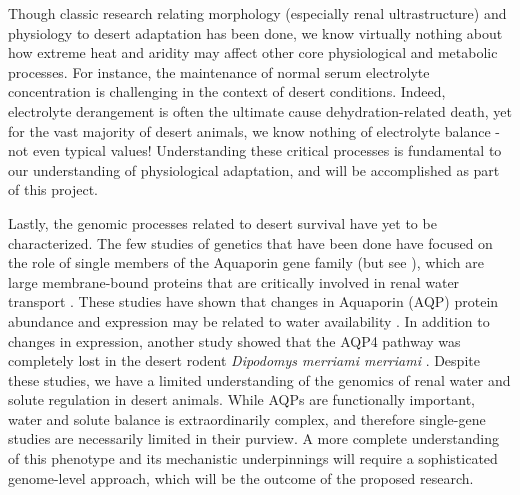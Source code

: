 \documentclass[11pt]{article}
\begin{document}
Though classic research relating morphology (especially renal ultrastructure) and physiology to desert adaptation has been done, we know virtually nothing about how extreme heat and aridity may affect other core physiological and metabolic processes. For instance, the maintenance of normal serum electrolyte concentration is challenging in the context of desert conditions. Indeed, electrolyte derangement is often the ultimate cause dehydration-related death, yet for the vast majority of desert animals, we know nothing of electrolyte balance - not even typical values! Understanding these critical processes is fundamental to our understanding of physiological adaptation, and will be accomplished as part of this project. 

Lastly, the genomic processes related to desert survival have yet to be characterized. The few studies of genetics that have been done have focused on the role of single members of the Aquaporin gene family (but see \cite{Bartolo:2007hy}), which are large membrane-bound proteins that are critically involved in renal water transport \citep{Kwon:2009bv,Verkman:2002ww,Brown:1995vo,Nielsen:1995cb}. These studies have shown that changes in Aquaporin (AQP) protein abundance and expression may be related to water availability \citep{Boselt:2009fb, Gallardo:2005fm,Bozinovic:2003eg}. In addition to changes in expression, another study showed that the AQP4 pathway was completely lost in the desert rodent \textit{Dipodomys merriami merriami} \citep{Huang:2001ti}. Despite these studies, we have a limited understanding of the genomics of renal water and solute regulation in desert animals. While AQPs are functionally important, water and solute balance is extraordinarily complex, and therefore single-gene studies are necessarily limited in their purview. A more complete understanding of this phenotype and its mechanistic underpinnings will require a sophisticated genome-level approach, which will be the outcome of the proposed research. 
\end{document}
